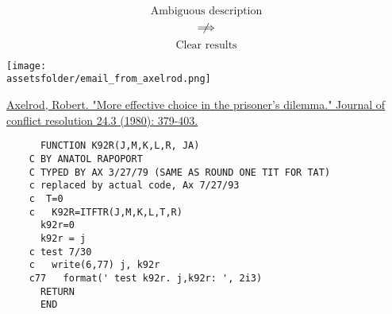 \documentclass{beamer}
\newcommand{\assetsfolder}{./assets}
\begin{document}
    \begin{frame}

        \begin{center}
            \Huge
            \[
                \text{Ambiguous description}
            \]
            \[
                \centernot\implies
            \]
            \[
                \text{Clear results}
            \]
        \end{center}

    \end{frame}

    \begin{frame}
    \begin{center}
        \texttt{[image: \\assetsfolder/email\_from\_axelrod.png]}
        \end{center}

    \end{frame}

    \begin{frame}
    \begin{center}
        \href{https://journals.sagepub.com/doi/abs/10.1177/002200278002400301}{Axelrod, Robert. "More effective choice in the prisoner's dilemma." Journal of conflict resolution 24.3 (1980): 379-403.}
        \end{center}

    \end{frame}

\begin{frame}[fragile]{}
    \begin{verbatim}
      FUNCTION K92R(J,M,K,L,R, JA)
    C BY ANATOL RAPOPORT
    C TYPED BY AX 3/27/79 (SAME AS ROUND ONE TIT FOR TAT)
    c replaced by actual code, Ax 7/27/93
    c  T=0
    c   K92R=ITFTR(J,M,K,L,T,R)
      k92r=0
      k92r = j
    c test 7/30
    c   write(6,77) j, k92r
    c77   format(' test k92r. j,k92r: ', 2i3)
      RETURN
      END
        \end{verbatim}

\end{frame}

    \begin{frame}
    \begin{center}
        \scalebox{.8}{
            
                     }
    \end{center}
    \end{frame}
\end{document}
